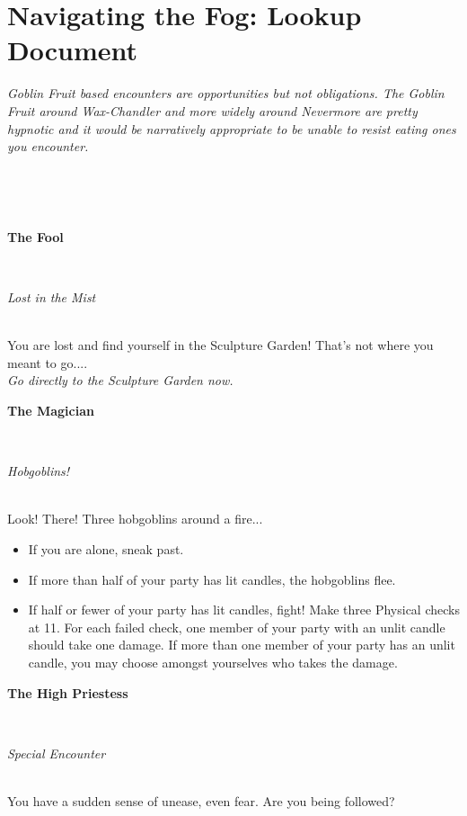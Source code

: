 \documentclass[white]{gl2018}
\begin{document}
\name{\wFog{}}

\section*{Navigating the Fog: Lookup Document}
\emph{Goblin Fruit based encounters are opportunities but not obligations. The Goblin Fruit around Wax-Chandler and more widely around Nevermore are pretty hypnotic and it would be narratively appropriate to be unable to resist eating ones you encounter.}
\newcommand{\areastart}[2]{ \begin{huge}{\bf {#1}} \end{huge} \\ \begin{large} \emph{#2} \end{large}\\}
\newcommand{\hobgoblins}[3]{Look!  There!  #1 hobgoblins around a fire...  

\begin{itemize}
\item If you are alone, sneak past.
\item If more than half of your party has lit candles, the hobgoblins flee.
\item If half or fewer of your party has lit candles, fight!  Make #2 Physical checks at #3.  For each failed check, one member of your party with an unlit candle should take one damage.  If more than one member of your party has an unlit candle, you may choose amongst yourselves who takes the damage.
\end{itemize}}
\newenvironment{location}[2]{\begin{minipage}{\textwidth}\areastart{#1}{#2}}{\end{minipage}\vspace{0.3in}}
\newcommand{\lost}[1]{You are lost and find yourself in #1!  That's not where you meant to go....\\{\em Go directly to #1 now.}}
\begin{location}{\hspace{0.5in}}{ }
\end{location}
\begin{location}{The Fool}{Lost in the Mist}
\lost{the Sculpture Garden}
\end{location}
\begin{location}{The Magician}{Hobgoblins!}
\hobgoblins{Three}{three}{11}
\end{location}
\begin{location}{The High Priestess}{Special Encounter}
You have a sudden sense of unease, even fear.  Are you being followed?
\end{location}
\end{document}
